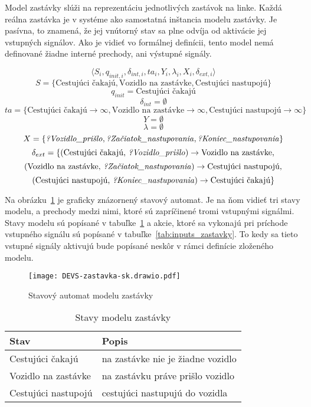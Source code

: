 Model zastávky slúži na reprezentáciu jednotlivých zastávok na linke.
Každá reálna zastávka je v systéme ako samostatná inštancia modelu zastávky.
Je pasívna, to znamená, že jej vnútorný stav sa plne odvíja od aktivácie jej vstupných signálov.
Ako je vidieť vo formálnej definícii, tento model nemá definované žiadne interné prechody, ani výstupné signály.

\[\langle S_i, q_{init,i}, {\delta}_{int,i}, ta_i, Y_i, {\lambda}_i, X_i, {\delta}_{ext,i} \rangle\]
\[S = \{\text{Cestujúci čakajú}, \text{Vozidlo na zastávke}, \text{Cestujúci nastupojú} \}\]
\[q_{init} = \text{Cestujúci čakajú}\]
\[\delta_{int} = \emptyset\]
\[ta = \{ \text{Cestujúci čakajú} \rightarrow \infty, \text{Vozidlo na zastávke} \rightarrow \infty, \text{Cestujúci nastupojú} \rightarrow \infty \}\]
\[Y = \emptyset\]
\[\lambda = \emptyset\]
\[X = \{\text{\textit{?Vozidlo\_prišlo}}, \text{\textit{?Začiatok\_nastupovania}}, \text{\textit{?Koniec\_nastupovania}} \}\]
\[\delta_{ext} = \{ (\text{Cestujúci čakajú, \textit{?Vozidlo\_prišlo}}) \rightarrow \text{Vozidlo na zastávke},\]
\[(\text{Vozidlo na zastávke, \textit{?Začiatok\_nastupovania}}) \rightarrow \text{Cestujúci nastupojú},\]
\[(\text{Cestujúci nastupojú, \textit{?Koniec\_nastupovania}}) \rightarrow \text{Cestujúci čakajú} \}\]

Na obrázku~\ref{fig:model_zastavky} je graficky znázornený stavový automat.
Je na ňom vidieť tri stavy modelu, a prechody medzi nimi, ktoré sú zapríčinené tromi vstupnými signálmi.
Stavy modelu sú popísané v tabuľke~\ref{tab:stavy_zastavky} a akcie, ktoré sa vykonajú pri príchode vstupného signálu sú popísané v tabuľke~\ref{tab:inputs_zastavky}.
To kedy sa tieto vstupné signály aktivujú bude popísané neskôr v rámci definície zloženého modelu.

\begin{figure}[h]\label{fig:model_zastavky}
  \centering
  \texttt{[image: DEVS-zastavka-sk.drawio.pdf]}
  \caption{Stavový automat modelu zastávky}
\end{figure}

\begin{table}[h]\label{tab:stavy_zastavky}
  \centering
  \begin{tabularx}{\textwidth}{|l|X|}
    \hline
    \textbf{Stav} & \textbf{Popis} \\ \hline
    Cestujúci čakajú & na zastávke nie je žiadne vozidlo \\ \hline
    Vozidlo na zastávke & na zastávku práve prišlo vozidlo \\ \hline
    Cestujúci nastupojú & cestujúci nastupujú do vozidla \\ \hline
  \end{tabularx}
  \caption{Stavy modelu zastávky}
\end{table}


